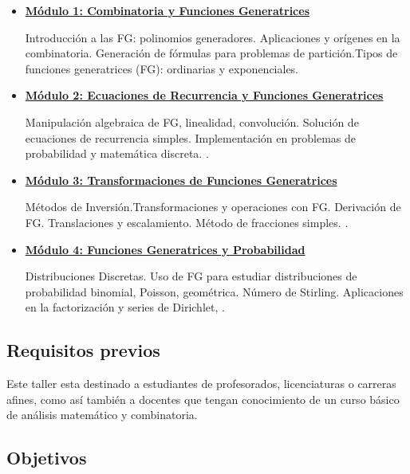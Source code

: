 \begin{itemize}
	\item \underline{\textbf{Módulo 1: Combinatoria y Funciones Generatrices}}
	
	Introducción a las FG: polinomios generadores. Aplicaciones y orígenes en la combinatoria. Generación de fórmulas para problemas de partición.Tipos de funciones generatrices (FG): ordinarias y exponenciales.
	
	\item \underline{\textbf{Módulo 2: Ecuaciones de Recurrencia y Funciones Generatrices}}
	
	Manipulación algebraica de FG, linealidad, convolución. Solución de ecuaciones de recurrencia simples. Implementación en problemas de probabilidad y matemática discreta. \textcite{vilenkin2010}.
	
	\item \underline{\textbf{Módulo 3: Transformaciones de Funciones Generatrices}}
	
	Métodos de Inversión.Transformaciones y operaciones con FG. Derivación de FG. Translaciones y escalamiento. Método de fracciones simples. \textcite{wilf1994, kaufmann1968}.
	
	\item \underline{\textbf{Módulo 4: Funciones Generatrices y Probabilidad}}
	
	Distribuciones Discretas. Uso de FG para estudiar distribuciones de probabilidad binomial, Poisson, geométrica. Número de Stirling. Aplicaciones en la factorización y series de Dirichlet, \textcite{riordan1978}.
\end{itemize}

\subsection{Requisitos previos}

Este taller esta destinado a estudiantes de profesorados, licenciaturas o carreras afines, como así también a docentes que tengan conocimiento de un curso básico de análisis matemático y combinatoria.

\subsection{Objetivos}

